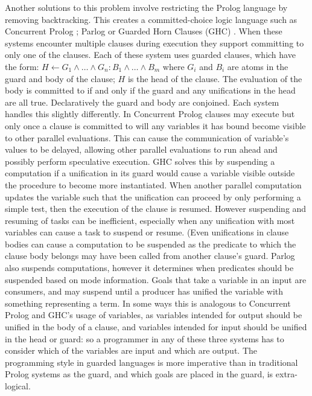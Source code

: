 Another solutions to this problem involve restricting the Prolog language
by removing backtracking.
This creates a committed-choice logic language such as
Concurrent Prolog \citep*{saraswat86:concurrent_prolog_definition,
shapiro:flat_concur_prolog};
Parlog \citep*{clark:84:parlog_sys_prog,clark:86:parlog}
or Guarded Horn Clauses (GHC) \citep*{ueda:ghc}.
When these systems encounter multiple clauses during execution they support
committing to only one of the clauses.
Each of these system uses guarded clauses, which have the
form:
$H \leftarrow G_1 \wedge \ldots \wedge G_n : B_1 \wedge \ldots \wedge B_m$
where $G_i$ and $B_i$ are atoms in the guard and body of the
clause;
$H$ is the head of the clause.
The evaluation of the body is committed to if and only if the guard and any
unifications in the head are all true.
Declaratively the guard and body are conjoined.
Each system handles this slightly differently.
In Concurrent Prolog clauses may execute but only once a clause is committed
to will any variables it has bound become visible to other parallel
evaluations.
This can cause the communication of variable's values to be delayed,
allowing other parallel evaluations to run ahead and possibly perform
speculative execution.
GHC solves this by suspending a computation if a unification in its guard
would cause a variable visible outside the procedure to become more
instantiated.
When another parallel computation updates the variable such that the
unification can proceed by only performing a simple test,
then the execution of the clause is resumed.
However suspending and resuming of tasks can be inefficient,
especially when any unification with most variables can cause a task to
suspend or resume.
(Even unifications in clause bodies can cause a computation to be suspended
as the predicate to which the clause body belongs may have been called from
another clause's guard.
Parlog also suspends computations,
however it determines when predicates should be suspended based on mode
information.
Goals that take a variable in an input are consumers, and may suspend
until a producer has unified the variable with something representing a
term.
In some ways this is analogous to Concurrent Prolog and GHC's usage of
variables,
as variables intended for output should be unified in the body of a clause,
and variables intended for input should be unified in the head or guard:
so a programmer in any of these three systems has to consider which of the
variables are input and which are output.
The programming style in guarded languages is more imperative than
in traditional Prolog systems as the guard, and which goals are placed in
the guard, is extra-logical.

